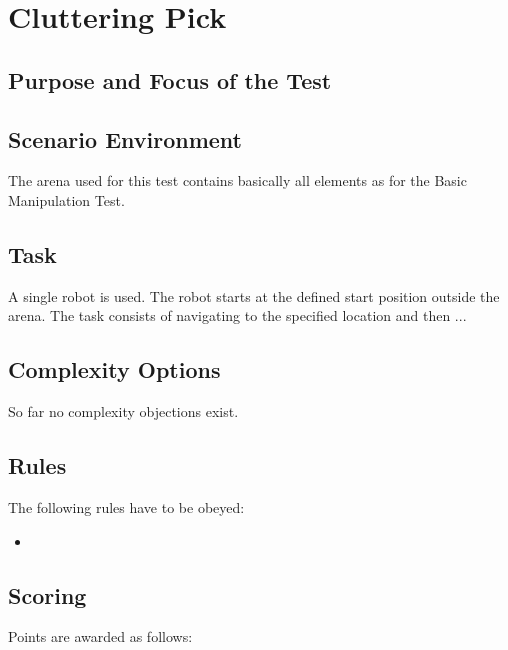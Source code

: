 \newpage
\section{Cluttering Pick}


\subsection{Purpose and Focus of the Test}


\subsection{Scenario Environment}
The arena used for this test contains basically all elements as for the Basic Manipulation Test.

\begin{figure}
\begin{center}
\end{center}
\end{figure}

\subsection{Task}
A single robot is used. The robot starts at the defined start position outside the arena. The task consists of navigating to the specified location and then ...


\subsection{Complexity Options}

So far no complexity objections exist.

\subsection{Rules}
The following rules have to be obeyed:

\begin{itemize}
\item
\end{itemize}


\subsection{Scoring}
Points are awarded as follows:
